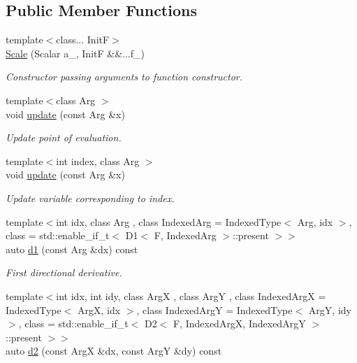 \subsection*{Public Member Functions}
\begin{DoxyCompactItemize}
\item 
{\footnotesize template$<$class... Init\-F$>$ }\\\hyperlink{structFunG_1_1MathematicalOperations_1_1Scale_a8b252a78659ba7ada90bae772ae7178e}{Scale} (Scalar a\-\_\-, Init\-F \&\&...f\-\_\-)
\begin{DoxyCompactList}\small\item\em Constructor passing arguments to function constructor. \end{DoxyCompactList}\item 
{\footnotesize template$<$class Arg $>$ }\\void \hyperlink{structFunG_1_1MathematicalOperations_1_1Scale_a72b90a29758d4a15e4c82c60d9692519}{update} (const Arg \&x)
\begin{DoxyCompactList}\small\item\em Update point of evaluation. \end{DoxyCompactList}\item 
{\footnotesize template$<$int index, class Arg $>$ }\\void \hyperlink{structFunG_1_1MathematicalOperations_1_1Scale_ad3bc61a8b77167ff35d7b6027e2146b6}{update} (const Arg \&x)
\begin{DoxyCompactList}\small\item\em Update variable corresponding to index. \end{DoxyCompactList}\item 
{\footnotesize template$<$int idx, class Arg , class Indexed\-Arg  = Indexed\-Type$<$ Arg, idx $>$, class  = std\-::enable\-\_\-if\-\_\-t$<$ D1$<$ F, Indexed\-Arg $>$\-::present $>$$>$ }\\auto \hyperlink{structFunG_1_1MathematicalOperations_1_1Scale_a3faeb9f1eac07cd6b73004dabadf665b}{d1} (const Arg \&dx) const 
\begin{DoxyCompactList}\small\item\em First directional derivative. \end{DoxyCompactList}\item 
{\footnotesize template$<$int idx, int idy, class Arg\-X , class Arg\-Y , class Indexed\-Arg\-X  = Indexed\-Type$<$ Arg\-X, idx $>$, class Indexed\-Arg\-Y  = Indexed\-Type$<$ Arg\-Y, idy $>$, class  = std\-::enable\-\_\-if\-\_\-t$<$ D2$<$ F, Indexed\-Arg\-X, Indexed\-Arg\-Y $>$\-::present $>$$>$ }\\auto \hyperlink{structFunG_1_1MathematicalOperations_1_1Scale_ac0f475d2accde030be697dd6c07f666e}{d2} (const Arg\-X \&dx, const Arg\-Y \&dy) const 

\end{DoxyCompactItemize}
